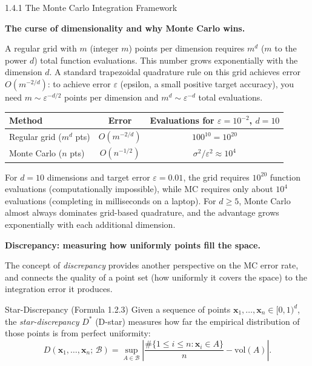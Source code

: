 \documentclass[aspectratio=169,10pt]{beamer}
\begin{document}
\begin{frame}[allowframebreaks]{1.4.1 The Monte Carlo Integration Framework}
  \framebreak

  \textbf{The curse of dimensionality and why Monte Carlo wins.}

  A regular grid with $m$ (integer $m$) points per dimension requires $m^d$
  ($m$ to the power $d$) total function evaluations.  This number grows
  exponentially with the dimension $d$.  A standard trapezoidal quadrature rule
  on this grid achieves error $O(m^{-2/d})$: to achieve error $\varepsilon$
  (epsilon, a small positive target accuracy), you need $m \sim \varepsilon^{-d/2}$
  points per dimension and $m^d \sim \varepsilon^{-d}$ total evaluations.

  \begin{center}
  \begin{tabular}{lcc}
    \toprule
    Method & Error & Evaluations for $\varepsilon = 10^{-2}$, $d = 10$ \\
    \midrule
    Regular grid ($m^d$ pts)   & $O(m^{-2/d})$ & $100^{10} = 10^{20}$ \\
    Monte Carlo ($n$ pts)      & $O(n^{-1/2})$ & $\sigma^2 / \varepsilon^2 \approx 10^4$ \\
    \bottomrule
  \end{tabular}
  \end{center}

  For $d = 10$ dimensions and target error $\varepsilon = 0.01$, the grid
  requires $10^{20}$ function evaluations (computationally impossible), while
  MC requires only about $10^4$ evaluations (completing in milliseconds on a
  laptop).  For $d \ge 5$, Monte Carlo almost always dominates grid-based
  quadrature, and the advantage grows exponentially with each additional
  dimension.

  \framebreak

  \textbf{Discrepancy: measuring how uniformly points fill the space.}

  The concept of \emph{discrepancy} provides another perspective on the MC
  error rate, and connects the quality of a point set (how uniformly it covers
  the space) to the integration error it produces.

  \begin{block}{Star-Discrepancy (Formula 1.2.3)}
    Given a sequence of points $\mathbf{x}_1, \ldots, \mathbf{x}_n \in
    [0,1)^d$, the \emph{star-discrepancy} $D^*$ (D-star) measures how far the
    empirical distribution of those points is from perfect uniformity:
    \[
      D(\mathbf{x}_1, \ldots, \mathbf{x}_n;\, \mathcal{B})
      = \sup_{A \in \mathcal{B}}
        \left|
          \frac{\#\{1 \le i \le n : \mathbf{x}_i \in A\}}{n}
          - \mathrm{vol}(A)
        \right|.
      \tag{1.2.3}
    \]
  \end{block}


\end{frame}
\end{document}
